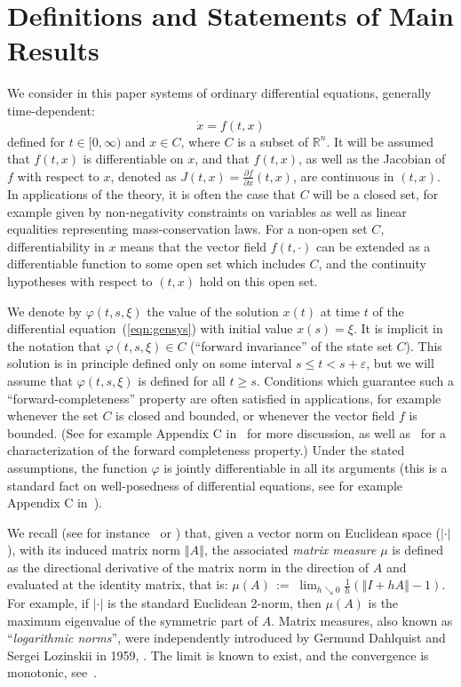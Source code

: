 \documentclass{svmult}
\newcommand{\opteqn}[1]{$#1$}
\newcommand{\R}{{\mathbb R}}  %
\newcommand{\abs}[1]{\left\vert #1 \right\vert}
\newcommand{\norm}[1]{\left\Vert #1 \right\Vert}
\newcommand{\be}[1]{\begin{equation}\label{#1}}
\newcommand{\ee}{\end{equation}}
\begin{document}
\section{Definitions and Statements of Main Results}
\label{sec:defs}

We consider in this paper systems of ordinary differential equations,
generally time-dependent:
\be{eqn:gensys}
\dot x = f(t,x)
\ee
defined for $t\in [0,\infty )$ and $x\in C$, where $C$ is a subset of $\R^n$.
It will be assumed that $f(t,x)$ is differentiable on $x$, and that
$f(t,x)$, as well as the Jacobian of $f$ with respect to $x$,
denoted as $J(t,x) = \frac{\partial f}{\partial x}(t,x)$, are continuous in $(t,x)$. 
In applications of the theory, it is often the case that $C$ will
be a closed set, for example given by non-negativity constraints on variables
as well as linear equalities representing mass-conservation laws.
For a non-open set $C$, differentiability in $x$ means that the vector field
$f(t,\cdot )$ can be extended as a differentiable function to some open set which
includes $C$, and the continuity hypotheses with respect to $(t,x)$ hold on
this open set.

We denote by
$
\varphi(t,s,\xi )
$
the value of the solution $x(t)$ at time $t$ of the differential
equation~(\ref{eqn:gensys}) with initial value $x(s)=\xi $.
It is implicit in the notation that $\varphi(t,s,\xi )\in C$ (``forward invariance''
of the state set $C$).
This solution is in principle defined only on some interval $s\leq t<s+\varepsilon $,
but we will assume that $\varphi(t,s,\xi )$ is defined for all $t\geq s$.
Conditions which guarantee such a ``forward-completeness'' property
are often satisfied in applications, for example whenever
the set $C$ is closed and bounded, or whenever the vector field $f$ is
bounded.  (See for example Appendix C in~\cite{mct} for more discussion, as well
as~\cite{angeli-sontag-fc} for a characterization of the forward completeness
property.) 
Under the stated assumptions, the function $\varphi$ is jointly differentiable
in all its arguments (this is a standard fact on well-posedness of
differential equations, see for example Appendix C in~\cite{mct}).

We recall (see for instance~\cite{michelbook} or
\cite{desoer-vidyasagar-siam}) that, given a vector norm on Euclidean space
($\abs{\cdot }$), with its induced matrix norm $\norm{A}$, the associated
\emph{matrix measure} $\mu $ is defined as the directional derivative of the
matrix norm in the direction of $A$ and evaluated at the identity matrix, that
is:
\opteqn{
\mu (A) \,:=\;
\lim_{h \searrow 0} \frac{1}{h} \left(\norm{I+hA}-1\right).
}
For example, if $\abs{\cdot }$ is the standard Euclidean 2-norm, then
$\mu (A)$ is the maximum eigenvalue of the symmetric part of $A$.
Matrix measures, also known as ``\emph{logarithmic norms}'', were
independently introduced by Germund Dahlquist and Sergei Lozinskii in 1959,
\cite{dahlquist,lozinskii}.
The limit is known to exist, and the convergence is monotonic,
see~\cite{strom,dahlquist}.
\end{document}

